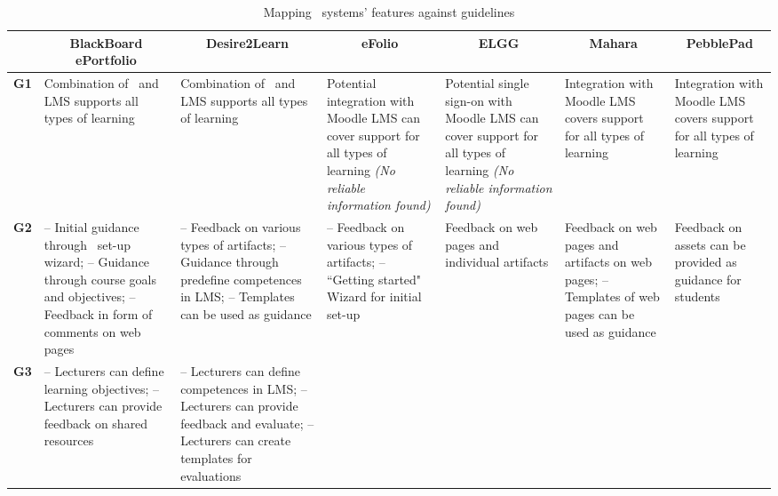 \begin{sidewaystable} \scriptsize
\centering
	\caption{Mapping \ep~systems' features against \LLLs guidelines}
	\begin{tabular}{|c|p{3.25cm}|p{3.25cm}|p{3.25cm}|p{3.25cm}|p{3.25cm}|p{3.25cm}|}
	\hline
	 \multicolumn{1}{|c|}{} &
     \multicolumn{1}{c|}{\textbf{BlackBoard ePortfolio}} & 
     \multicolumn{1}{c|}{\textbf{Desire2Learn}} & 
     \multicolumn{1}{c|}{\textbf{eFolio}} & 
     \multicolumn{1}{c|}{\textbf{ELGG}} & 
     \multicolumn{1}{c|}{\textbf{Mahara}} & 
     \multicolumn{1}{c|}{\textbf{PebblePad}} \\ \hline
	\textbf{G1} & 
	Combination of \ep~and LMS supports all types of learning & 
	Combination of \ep~and LMS supports all types of learning & 
	Potential integration with Moodle LMS can cover support for all types of
	learning \textit{(No reliable information found)} & Potential single sign-on
	with Moodle LMS can cover support for all types of learning \textit{(No
	reliable information found)} & Integration with Moodle LMS covers support for
	all types of learning & Integration with Moodle LMS covers support for all
	types of learning \\ \hline \textbf{G2} & 
	-- Initial guidance through \ep~set-up wizard; \newline -- Guidance through
	 course goals and objectives; \newline -- Feedback in form of comments on
	web pages & -- Feedback on various types of artifacts; \newline -- Guidance
	through predefine competences in LMS; \newline -- Templates can be used as
	guidance & -- Feedback on various types of artifacts; \newline -- ``Getting
	started" Wizard for initial set-up & 
	Feedback on web pages and individual artifacts & 
	Feedback on web pages and artifacts on web pages; \newline -- Templates of web
	pages can be used as guidance & 
	Feedback on assets can be provided as guidance for students \\ \hline 
	\textbf{G3} & 
	-- Lecturers can define learning objectives; \newline -- Lecturers can provide
	feedback on shared resources & 
	-- Lecturers can define competences in LMS; \newline -- Lecturers can
	provide feedback and evaluate; \newline -- Lecturers can create templates for
	evaluations & 

\end{tabular}
\end{sidewaystable}
